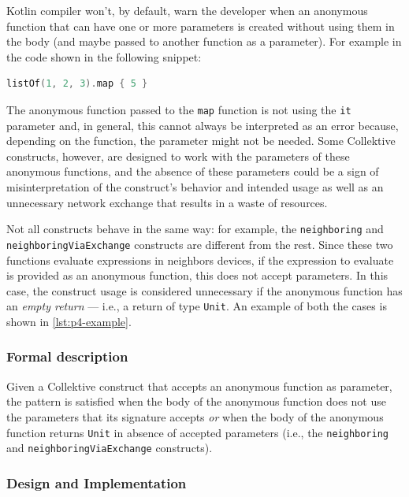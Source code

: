 \documentclass[12pt,a4paper,openright,twoside]{book}
\begin{document}
Kotlin compiler won't, by default, warn the developer when an anonymous function
that can have one or more parameters is created without using them in the body 
(and maybe passed to another function as a parameter). For example in the code
shown in the following snippet:

\begin{lstlisting}[language=Kotlin]
listOf(1, 2, 3).map { 5 }
\end{lstlisting}

The anonymous function passed to the \lstinline{map} function is not using the
\lstinline{it} parameter and, in general, this cannot always be interpreted as
an error because, depending on the function, the parameter might not be needed.
%
Some Collektive constructs, however, are designed to work with the parameters of
these anonymous functions, and the absence of these parameters could be a sign
of misinterpretation of the construct's behavior and intended usage as well as 
an unnecessary network exchange that results in a waste of resources.

Not all constructs behave in the same way: for example, the
\lstinline{neighboring} and \lstinline{neighboringViaExchange} constructs are
different from the rest. Since these two functions evaluate expressions in
neighbors devices, if the expression to evaluate is provided as an anonymous
function, this does not accept parameters. In this case, the construct usage is
considered unnecessary if the anonymous function has an \emph{empty return} ---
i.e., a return of type \lstinline{Unit}. 
%
An example of both the cases is shown in \cref{lst:p4-example}.



\subsubsection{Formal description}

Given a Collektive construct that accepts an anonymous function as parameter,
the pattern is satisfied when the body of the anonymous function does not use the
parameters that its signature accepts \emph{or} when the body of the anonymous
function returns \lstinline{Unit} in absence of accepted parameters (i.e., the
\lstinline{neighboring} and \lstinline{neighboringViaExchange} constructs).

\subsubsection{Design and Implementation}
\end{document}

